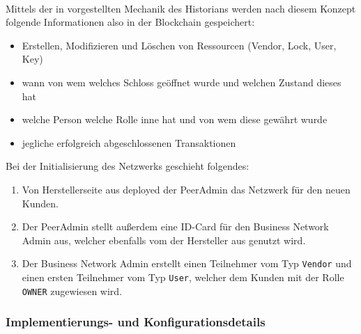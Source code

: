         \medskip\\
        Mittels der in  vorgestellten Mechanik des Historians werden nach diesem Konzept folgende Informationen also in der Blockchain gespeichert:
        \begin{itemize}[noitemsep]
            \item Erstellen, Modifizieren und Löschen von Ressourcen (Vendor, Lock, User, Key)
            \item wann von wem welches Schloss geöffnet wurde und welchen Zustand dieses hat
            \item welche Person welche Rolle inne hat und von wem diese gewährt wurde
            \item jegliche erfolgreich abgeschlossenen Transaktionen
        \end{itemize}
        \indent Bei der Initialisierung des Netzwerks geschieht folgendes:
        \begin{enumerate}
            \item Von Herstellerseite aus deployed der PeerAdmin das Netzwerk für den neuen Kunden.
            \item Der PeerAdmin stellt außerdem eine ID-Card für den Business Network Admin aus, welcher ebenfalls vom der Hersteller aus genutzt wird.
            \item Der Business Network Admin erstellt einen Teilnehmer vom Typ \colorbox{light-gray}{\lstinline{Vendor}} und einen ersten Teilnehmer vom Typ \colorbox{light-gray}{\lstinline{User}}, welcher dem Kunden mit der Rolle \colorbox{light-gray}{\lstinline{OWNER}} zugewiesen wird. 
        \end{enumerate}
        
    \subsubsection{Implementierungs- und Konfigurationsdetails}
    \label{sec:prototype_arch_impl}
